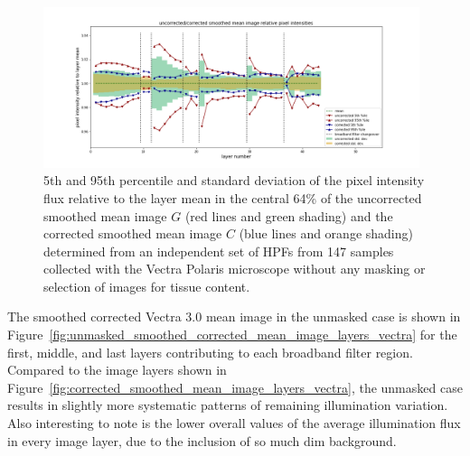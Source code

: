 \documentclass[letterpaper,11pt]{article}
\newcommand{\reffig}[1]{Figure~\ref{#1}}
\begin{document}
\begin{figure}[!ht]
\centering
\includegraphics[width=0.98\textwidth]{images/results/unmasked_flatfield_illumination_variation_reduction_polaris}
\caption{\footnotesize 5th and 95th percentile and standard deviation of the pixel intensity flux relative to the layer mean in the central 64\% of the uncorrected smoothed mean image $G$ (red lines and green shading) and the corrected smoothed mean image $C$ (blue lines and orange shading) determined from an independent set of HPFs from 147 samples collected with the Vectra Polaris microscope without any masking or selection of images for tissue content.}
\label{fig:unmasked_illumination_variation_reduction_polaris}
\end{figure} 

The smoothed corrected Vectra 3.0 mean image in the unmasked case is shown in \reffig{fig:unmasked_smoothed_corrected_mean_image_layers_vectra} for the first, middle, and last layers contributing to each broadband filter region. Compared to the image layers shown in \reffig{fig:corrected_smoothed_mean_image_layers_vectra}, the unmasked case results in slightly more systematic patterns of remaining illumination variation. Also interesting to note is the lower overall values of the average illumination flux in every image layer, due to the inclusion of so much dim background.
\end{document}
